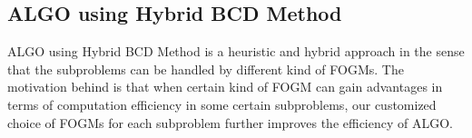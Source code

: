\begin{algorithm}[H]
\begin{algorithmic}[1]
            \EndFor
        \EndFor
    \end{algorithmic}
\end{algorithm}

\newpage
\subsection{ALGO using Hybrid BCD Method}
ALGO using Hybrid BCD Method is a heuristic and hybrid approach in the sense
that the subproblems can be handled by different kind of FOGMs.
The motivation behind is that when certain kind of FOGM can gain advantages in
terms of computation efficiency in some certain subproblems, our customized
choice of FOGMs for each subproblem further improves the efficiency of ALGO.

